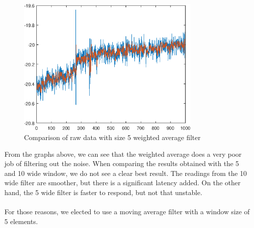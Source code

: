 \documentclass{article}
\begin{document}
    \begin{figure}[!htb]
        \centering
        \includegraphics[width = 0.8\textwidth]{../weighted_average_5.eps}
        \caption{Comparison of raw data with size 5 weighted average filter}
    \end{figure}

\clearpage

    From the graphs above, we can see that the weighted average does a very poor job of filtering out the noise. When comparing the results obtained with the 5 and 10 wide window, we do not see a clear best result. The readings from the 10 wide filter are smoother, but there is a significant latency added. On the other hand, the 5 wide filter is faster to respond, but not that unstable. 
    \\
    \\
    For those reasons, we elected to use a moving average filter with a window size of 5 elements.
\end{document}
